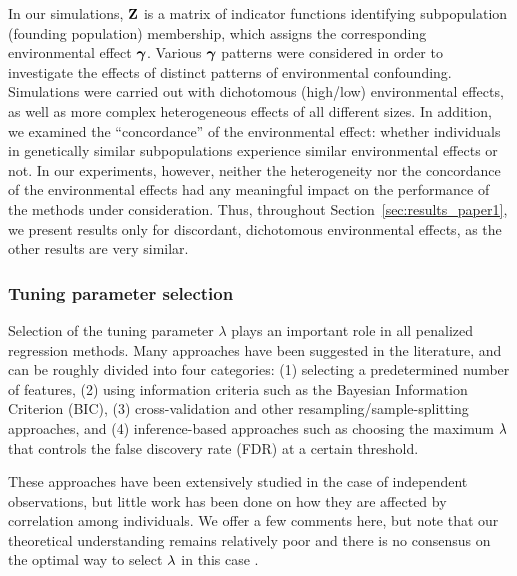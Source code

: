 In our simulations, $\mathbf{Z}$ is a matrix of indicator functions identifying subpopulation (founding population) membership, which assigns the corresponding environmental effect $\boldsymbol{\gamma}$. Various $\boldsymbol{\gamma}$ patterns were considered in order to investigate the effects of distinct patterns of environmental confounding.  Simulations were carried out with dichotomous (high/low) environmental effects, as well as more complex heterogeneous effects of all different sizes.  In addition, we examined the ``concordance'' of the environmental effect: whether individuals in genetically similar subpopulations experience similar environmental effects or not.  In our experiments, however, neither the heterogeneity nor the concordance of the environmental effects had any meaningful impact on the performance of the methods under consideration.  Thus, throughout Section~\ref{sec:results_paper1}, we present results only for discordant, dichotomous environmental effects, as the other results are very similar.

\subsubsection{Tuning parameter selection}

Selection of the tuning parameter $\lambda$ plays an important role in all penalized regression methods.  Many approaches have been suggested in the literature, and can be roughly divided into four categories: (1) selecting a predetermined number of features, (2) using information criteria such as the Bayesian Information Criterion (BIC), (3) cross-validation and other resampling/sample-splitting approaches, and (4) inference-based approaches such as choosing the maximum $\lambda$ that controls the false discovery rate (FDR) at a certain threshold.

These approaches have been extensively studied in the case of independent observations, but little work has been done on how they are affected by correlation among individuals.  We offer a few comments here, but note that our theoretical understanding remains relatively poor and there is no consensus on the optimal way to select $\lambda$ in this case \citep{wauthier2013comparative}.

